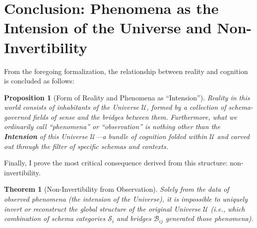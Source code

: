 \documentclass[11pt,a4paper]{article}
\theoremstyle{definition}
\theoremstyle{plain}
\newtheorem{proposition}[definition]{Proposition}
\newtheorem{theorem}[definition]{Theorem}
\begin{document}
\section{Conclusion: Phenomena as the Intension of the Universe and Non-Invertibility}

From the foregoing formalization, the relationship between reality and cognition is concluded as follows:

\begin{proposition}[Form of Reality and Phenomena as ``Intension'']
Reality in this world consists of inhabitants of the Universe $\mathcal{U}$, formed by a collection of schema-governed fields of sense and the bridges between them. Furthermore, what we ordinarily call ``phenomena'' or ``observation'' is nothing other than the \textbf{Intension} of this Universe $\mathcal{U}$---a bundle of cognition folded within $\mathcal{U}$ and carved out through the filter of specific schemas and contexts.
\end{proposition}

Finally, I prove the most critical consequence derived from this structure: non-invertibility.

\begin{theorem}[Non-Invertibility from Observation]
Solely from the data of observed phenomena (the intension of the Universe), it is impossible to uniquely invert or reconstruct the global structure of the original Universe $\mathcal{U}$ (i.e., which combination of schema categories $\mathcal{S}_{i}$ and bridges $\mathcal{B}_{ij}$ generated those phenomena).
\end{theorem}
\end{document}
